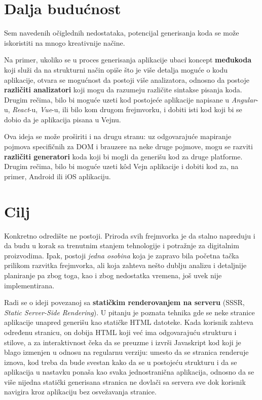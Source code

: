 \section{Dalja budućnost}

Sem navedenih očiglednih nedostataka, potencijal generisanja koda se može iskoristiti na mnogo kreativnije načine.

Na primer, ukoliko se u proces generisanja aplikacije ubaci koncept \textbf{međukoda} koji služi da na strukturni način opiše što je više detalja moguće o kodu aplikacije, otvara se mogućnost da postoji više analizatora, odnosno da postoje \textbf{različiti analizatori} koji mogu da razumeju različite sintakse pisanja koda.
Drugim rečima, bilo bi moguće uzeti kod postojeće aplikacije napisane u \textsl{Angular}-u, \textsl{React}-u, \textsl{Vue}-u, ili bilo kom drugom frejmvorku, i dobiti isti kod koji bi se dobio da je aplikacija pisana u Vejnu.

Ova ideja se može proširiti i na drugu stranu: uz odgovarajuće mapiranje pojmova specifičnih za DOM i brauzere na neke druge pojmove, mogu se razviti \textbf{različiti generatori} koda koji bi mogli da generišu kod za druge platforme.
Drugim rečima, bilo bi moguće uzeti kôd Vejn aplikacije i dobiti kod za, na primer, Android ili iOS aplikaciju.

\section{Cilj}

Konkretno odredište ne postoji.
Priroda svih frejmvorka je da stalno napreduju i da budu u korak sa trenutnim stanjem tehnologije i potražnje za digitalnim proizvodima.
Ipak, postoji \emph{jedna osobina} koja je zapravo bila početna tačka prilikom razvitka frejmvorka, ali koja zahteva nešto dublju analizu i detaljnije planiranje pa zbog toga, kao i zbog nedostatka vremena, još uvek nije implementirana.

Radi se o ideji povezanoj sa \textbf{statičkim renderovanjem na serveru} (SSSR, \textsl{Static Server-Side Rendering}).
U pitanju je poznata tehnika gde se neke stranice aplikacije unapred generišu kao statičke HTML datoteke.
Kada korisnik zahteva određenu stranicu, on dobija HTML koji već ima odgovarajuću strukturu i stilove, a za interaktivnost čeka da se preuzme i izvrši Javaskript kod koji je blago izmenjen u odnosu na regularnu verziju: umesto da se stranica renderuje iznova, kod treba da bude svestan kako da se  u postojeću strukturu i da se aplikacija u nastavku ponaša kao svaka jednostranična aplikacija, odnosno da se više nijedna statički generisana stranica ne dovlači sa servera sve dok korisnik navigira kroz aplikaciju bez osvežavanja stranice.

